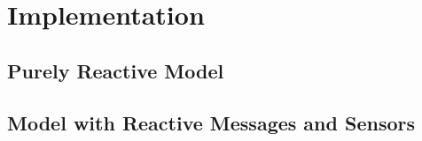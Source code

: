 \chapter{Implementation}
\label{chap:implementation}

\section{Purely Reactive Model}

\section{Model with Reactive Messages and Sensors}
